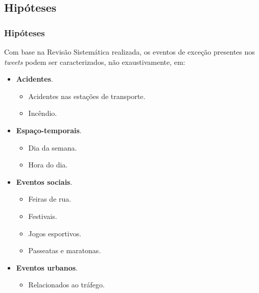 \documentclass{beamer}
\begin{document}
\subsection{Hipóteses}
\begin{frame}
\frametitle{Hipóteses}
Com base na Revisão Sistemática realizada, os eventos de exceção presentes nos \textit{tweets} podem ser caracterizados, não exaustivamente, em:

\begin{itemize}
\item \textbf{Acidentes}.
\begin{itemize}
\item Acidentes nas estações de transporte.
\item Incêndio.
\end{itemize}

\item \textbf{Espaço-temporais}.
\begin{itemize}
\item Dia da semana.
\item Hora do dia.
\end{itemize}

\item \textbf{Eventos sociais}.
\begin{itemize}
\item Feiras de rua.
\item Festivais.
\item Jogos esportivos.
\item Passeatas e maratonas.
\end{itemize}

\item \textbf{Eventos urbanos}.
\begin{itemize}
\item Relacionados ao tráfego.
\end{itemize}

\end{itemize}

\end{frame}
\end{document}
